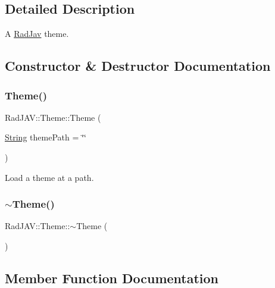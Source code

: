 \subsection{Detailed Description}
A \mbox{\hyperlink{class_rad_j_a_v_1_1_rad_jav}{Rad\+Jav}} theme. 

\subsection{Constructor \& Destructor Documentation}
\mbox{\label{class_rad_j_a_v_1_1_theme_a5b1649881314acd83096de433758be41}} 
\subsubsection{\texorpdfstring{Theme()}{Theme()}}
{\footnotesize\ttfamily Rad\+J\+A\+V\+::\+Theme\+::\+Theme (\begin{DoxyParamCaption}\item[{\mbox{\hyperlink{class_rad_j_a_v_1_1_string}{String}}}]{theme\+Path = {\ttfamily \char`\"{}\char`\"{}} }\end{DoxyParamCaption})}



Load a theme at a path. 

\mbox{\label{class_rad_j_a_v_1_1_theme_a7927c6251acff2d4bd162bb19b7fa637}} 
\subsubsection{\texorpdfstring{$\sim$\+Theme()}{~Theme()}}
{\footnotesize\ttfamily Rad\+J\+A\+V\+::\+Theme\+::$\sim$\+Theme (\begin{DoxyParamCaption}{ }\end{DoxyParamCaption})}



\subsection{Member Function Documentation}
\mbox{\label{class_rad_j_a_v_1_1_theme_ad94d2f3048ae0289215c18126bc2187e}} 
